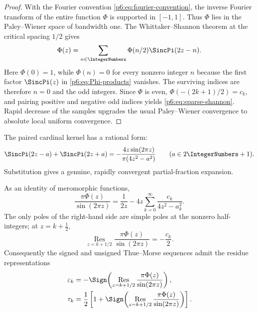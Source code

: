 \documentclass[11pt]{article}
\theoremstyle{definition}
\theoremstyle{remark}
\newcommand{\eps}{\varepsilon}
\begin{document}
\begin{proof}
With the Fourier convention \eqref{p6:eq:fourier-convention}, the inverse Fourier transform
of the entire function \(\Phi\) is supported in \([-1,1]\).  Thus \(\Phi\) lies in the
Paley--Wiener space of bandwidth one.  The Whittaker--Shannon theorem \cite{p6:HigginsSampling} at the critical
spacing \(1/2\) gives
\begin{equation}
 \Phi(z)=\sum_{n\in\IntegerNumbers}\Phi(n/2)\SincPi(2z-n).
                                                               \label{p6:eq:full-shannon}
\end{equation}
Here \(\Phi(0)=1\), while \(\Phi(n)=0\) for every nonzero integer \(n\) because the
first factor \(\SincPi(z)\) in \eqref{p6:eq:Phi-products} vanishes.  The surviving indices
are therefore \(n=0\) and the odd integers.  Since \(\Phi\) is even,
\(\Phi(-(2k+1)/2)=c_k\), and pairing positive and negative odd indices yields
\eqref{p6:eq:sparse-shannon}.  Rapid decrease of the samples upgrades the usual
Paley--Wiener convergence to absolute local uniform convergence.
\end{proof}

The paired cardinal kernel has a rational form:
\begin{equation}
 \SincPi(2z-a)+\SincPi(2z+a)
 =-\frac{4z\sin(2\pi z)}{\pi(4z^2-a^2)}
 \qquad(a\in2\IntegerNumbers+1).                                \label{p6:eq:paired-cardinal}
\end{equation}
Substitution gives a genuine, rapidly convergent partial-fraction expansion.

\begin{corollary}
\label{p6:cor:half-ML}
As an identity of meromorphic functions,
\begin{equation}
\boxed{
 \frac{\pi\Phi(z)}{\sin(2\pi z)}
 =\frac1{2z}
  -4z\sum_{k=0}^{\infty}
   \frac{c_k}{4z^2-a_k^2}.}                                \label{p6:eq:half-ML}
\end{equation}
The only poles of the right-hand side are simple poles at the nonzero half-integers; at
\(z=k+\tfrac12\),
\begin{equation}
 \operatorname*{Res}_{z=k+1/2}
 \frac{\pi\Phi(z)}{\sin(2\pi z)}=-\frac{c_k}{2}.           \label{p6:eq:half-residue}
\end{equation}
Consequently the signed and unsigned Thue--Morse sequences admit the residue
representations
\begin{align}
 \eps_k
 &=-\Sign\!\left(
 \operatorname*{Res}_{z=k+1/2}
 \frac{\pi\Phi(z)}{\sin(2\pi z)}\right),                 \label{p6:eq:tm-residue-sign}\\
 \tau_k
 &=\frac12\left[1+
 \Sign\!\left(
 \operatorname*{Res}_{z=k+1/2}
 \frac{\pi\Phi(z)}{\sin(2\pi z)}\right)\right].         \label{p6:eq:tm-residue-bit}
\end{align}
\end{corollary}
\end{document}
